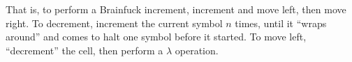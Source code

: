 That is, to perform a Brainfuck increment, increment and move left, then move right. To decrement, increment the current symbol $n$ times, until it “wraps around” and comes to halt one symbol before it started. To move left, “decrement” the cell, then perform a $\lambda$ operation.

%
%
%
%
